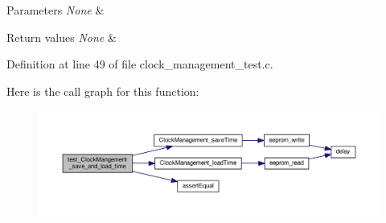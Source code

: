 \begin{DoxyParams}{Parameters}
{\em None} & \\
\hline
\end{DoxyParams}

\begin{DoxyRetVals}{Return values}
{\em None} & \\
\hline
\end{DoxyRetVals}


Definition at line 49 of file clock\+\_\+management\+\_\+test.\+c.



Here is the call graph for this function\+:\nopagebreak
\begin{figure}[H]
\begin{center}
\leavevmode
\includegraphics[width=350pt]{dc/d9e/group__clock__management__test__save__lod_gabfcdb446b5f81be9015c7fbfcf5bc6ca_cgraph}
\end{center}
\end{figure}


